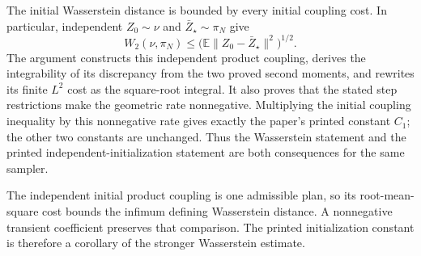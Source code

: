 \documentclass[11pt,a4paper]{report}
\begin{document}
The initial Wasserstein distance is bounded by every initial coupling cost. In particular, independent \(Z_0\sim\nu\) and \(\bar Z_\star\sim\pi_N\) give \[W_2(\nu,\pi_N)\le\bigl(\mathbb E\|Z_0-\bar Z_\star\|^2\bigr)^{1/2}.\] The argument constructs this independent product coupling, derives the integrability of its discrepancy from the two proved second moments, and rewrites its finite \(L^{2}\) cost as the square-root integral. It also proves that the stated step restrictions make the geometric rate nonnegative. Multiplying the initial coupling inequality by this nonnegative rate gives exactly the paper’s printed constant \(C_1\); the other two constants are unchanged. Thus the Wasserstein statement and the printed independent-initialization statement are both consequences for the same sampler.



The independent initial product coupling is one admissible plan, so its root-mean-square cost bounds the infimum defining Wasserstein distance. A nonnegative transient coefficient preserves that comparison. The printed initialization constant is therefore a corollary of the stronger Wasserstein estimate.
\end{document}
